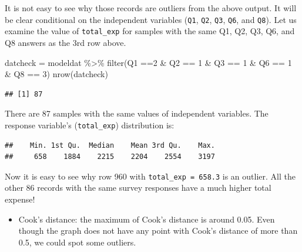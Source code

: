 \documentclass[
  12pt,
]{krantz}
\makeatletter
\newenvironment{Shaded}{\begin{snugshade}}{\end{snugshade}}
\newcommand{\DecValTok}[1]{\textcolor[rgb]{0.06,0.06,0.06}{#1}}
\newcommand{\FunctionTok}[1]{\textcolor[rgb]{0,0,0}{#1}}
\newcommand{\NormalTok}[1]{#1}
\newcommand{\OtherTok}[1]{\textcolor[rgb]{0.37,0.37,0.37}{#1}}
\newcommand{\SpecialCharTok}[1]{\textcolor[rgb]{0,0,0}{#1}}
\providecommand{\tightlist}{%
  \setlength{\itemsep}{0pt}\setlength{\parskip}{0pt}}
\newenvironment{kframe}{%
\medskip{}
\setlength{\fboxsep}{.8em}
 \def\at@end@of@kframe{}%
 \ifinner\ifhmode%
  \def\at@end@of@kframe{\end{minipage}}%
  \begin{minipage}{\columnwidth}%
 \fi\fi%
 \def\FrameCommand##1{\hskip\@totalleftmargin \hskip-\fboxsep
 \colorbox{shadecolor}{##1}\hskip-\fboxsep
     \hskip-\linewidth \hskip-\@totalleftmargin \hskip\columnwidth}%
 \MakeFramed {\advance\hsize-\width
   \@totalleftmargin\z@ \linewidth\hsize
   \@setminipage}}%
 {\par\unskip\endMakeFramed%
 \at@end@of@kframe}
\renewenvironment{Shaded}{\begin{kframe}}{\end{kframe}}
\makeatother
\begin{document}
It is not easy to see why those records are outliers from the above output. It will be clear conditional on the independent variables (\texttt{Q1}, \texttt{Q2}, \texttt{Q3}, \texttt{Q6}, and \texttt{Q8}). Let us examine the value of \texttt{total\_exp} for samples with the same Q1, Q2, Q3, Q6, and Q8 answers as the 3rd row above.

\begin{Shaded}
\begin{Highlighting}[]
\NormalTok{datcheck }\OtherTok{=}\NormalTok{ modeldat }\SpecialCharTok{\%\textgreater{}\%} \FunctionTok{filter}\NormalTok{(Q1 }\SpecialCharTok{==}\DecValTok{2} \SpecialCharTok{\&}\NormalTok{ Q2 }\SpecialCharTok{==} \DecValTok{1} \SpecialCharTok{\&}\NormalTok{ Q3 }\SpecialCharTok{==} \DecValTok{1} \SpecialCharTok{\&}\NormalTok{ Q6 }\SpecialCharTok{==} \DecValTok{1} \SpecialCharTok{\&}\NormalTok{ Q8 }\SpecialCharTok{==} \DecValTok{3}\NormalTok{) }
\FunctionTok{nrow}\NormalTok{(datcheck)}
\end{Highlighting}
\end{Shaded}

\begin{verbatim}
## [1] 87
\end{verbatim}

There are 87 samples with the same values of independent variables. The response variable's (\texttt{total\_exp}) distribution is:

\begin{Shaded}
\end{Shaded}

\begin{verbatim}
##    Min. 1st Qu.  Median    Mean 3rd Qu.    Max. 
##     658    1884    2215    2204    2554    3197
\end{verbatim}

Now it is easy to see why row 960 with \texttt{total\_exp\ =\ 658.3} is an outlier. All the other 86 records with the same survey responses have a much higher total expense!

\begin{itemize}
\tightlist
\item
  Cook's distance: the maximum of Cook's distance is around 0.05. Even though the graph does not have any point with Cook's distance of more than 0.5, we could spot some outliers.
\end{itemize}
\end{document}
